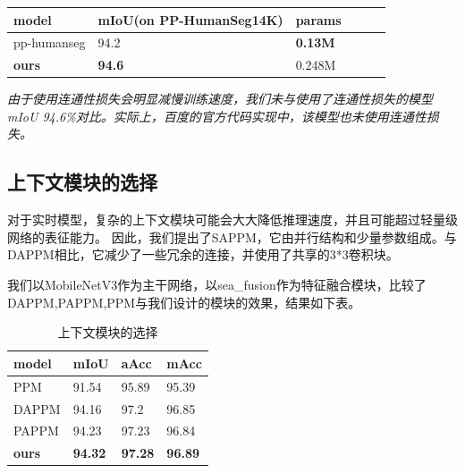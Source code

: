\documentclass[11pt]{article}
\begin{document}
\begin{table}[H]
  \centering
  \begin{tabular}{|l|l|l|l|l|l|}
  \hline
      model & mIoU(on PP-HumanSeg14K) & params \\ \hline
      pp-humanseg&94.2&\textbf{0.13M}\\\hline
      \textbf{ours}&\textbf{94.6}&0.248M\\\hline
  \end{tabular}
\end{table}

\textit{由于使用连通性损失会明显减慢训练速度，我们未与使用了连通性损失的模型mIoU 94.6\%对比。实际上，百度的官方代码实现中，该模型也未使用连通性损失。}


\subsection{上下文模块的选择}

对于实时模型，复杂的上下文模块可能会大大降低推理速度，并且可能超过轻量级网络的表征能力。
因此，我们提出了SAPPM，它由并行结构和少量参数组成。与DAPPM相比，它减少了一些冗余的连接，并使用了共享的3*3卷积块。

我们以MobileNetV3作为主干网络，以sea_fusion作为特征融合模块，比较了DAPPM,PAPPM,PPM与我们设计的模块的效果，结果如下表。
\begin{table}[!ht]
  \centering
  \begin{tabular}{|l|l|l|l|}
  \hline
      model & mIoU & aAcc & mAcc \\ \hline
      PPM & 91.54 & 95.89 & 95.39 \\ \hline
      DAPPM & 94.16 & 97.2 & 96.85 \\ \hline
      PAPPM & 94.23 & 97.23 & 96.84 \\ \hline
      \textbf{ours} & \textbf{94.32} & \textbf{97.28} & \textbf{96.89} \\ \hline
  \end{tabular}
\caption{上下文模块的选择}
  \label{fig:01}
\end{table}
\end{document}
